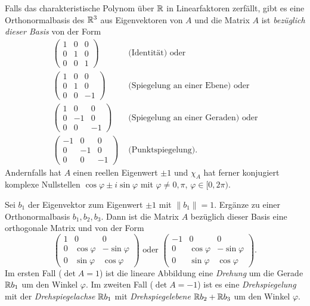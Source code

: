 \documentclass[
 a4paper,
 12pt,
 parskip=half
 ]{scrartcl}
\theoremstyle{plain}
\theoremstyle{definition}
\begin{document}
Falls das charakteristische Polynom über $\mathbb{R}$ in Linearfaktoren zerfällt, gibt es eine Orthonormalbasis des $\mathbb{R}^3$ aus Eigenvektoren von $A$ und die Matrix $A$ ist \emph{bezüglich dieser Basis} von der Form 
\begin{align*}
 \begin{pmatrix} 1 & 0 & 0 \\ 0 & 1 & 0 \\ 0 & 0 & 1 \end{pmatrix} &\text{ (Identität) oder} \\
 \begin{pmatrix} 1 & 0 & 0 \\ 0 & 1 & 0 \\ 0 & 0 & -1 \end{pmatrix} &\text{ (Spiegelung an einer Ebene) oder} \\
 \begin{pmatrix} 1 & 0 & 0 \\ 0 & -1 & 0 \\ 0 & 0 & -1 \end{pmatrix} &\text{ (Spiegelung an einer Geraden) oder} \\
 \begin{pmatrix} -1 & 0 & 0 \\ 0 & -1 & 0 \\ 0 & 0 & -1 \end{pmatrix} &\text{ (Punktspiegelung)}.
\end{align*}
Andernfalls hat $A$ einen reellen Eigenwert $\pm 1$ und $\chi_A$ hat ferner konjugiert komplexe Nullstellen $\cos \varphi \pm i \sin \varphi$ mit $\varphi \ne 0, \pi$, $\varphi \in [0, 2\pi)$.

Sei $b_1$ der Eigenvektor zum Eigenwert $\pm 1$ mit $\| b_1 \| = 1$. Ergänze zu einer Orthonormalbasis $b_1, b_2, b_3$. Dann ist die Matrix $A$ bezüglich dieser Basis eine orthogonale Matrix und von der Form 
\[ \begin{pmatrix} 1 & 0 & 0 \\ 0 & \cos \varphi & -\sin \varphi \\ 0 & \sin \varphi & \cos \varphi \end{pmatrix}
   \text{ oder }
   \begin{pmatrix} -1 & 0 & 0 \\ 0 & \cos \varphi & -\sin \varphi \\ 0 & \sin \varphi & \cos \varphi \end{pmatrix}. \]
Im ersten Fall ($\det A = 1$) ist die lineare Abbildung eine \emph{Drehung} um die Gerade $\mathbb{R} b_1$ um den Winkel $\varphi$. Im zweiten Fall ($\det A = -1$) ist es eine \emph{Drehspiegelung} mit der \emph{Drehspiegelachse} $\mathbb{R} b_1$ mit \emph{Drehspiegelebene} $\mathbb{R} b_2 + \mathbb{R} b_3$ um den Winkel $\varphi$.
\end{document}
